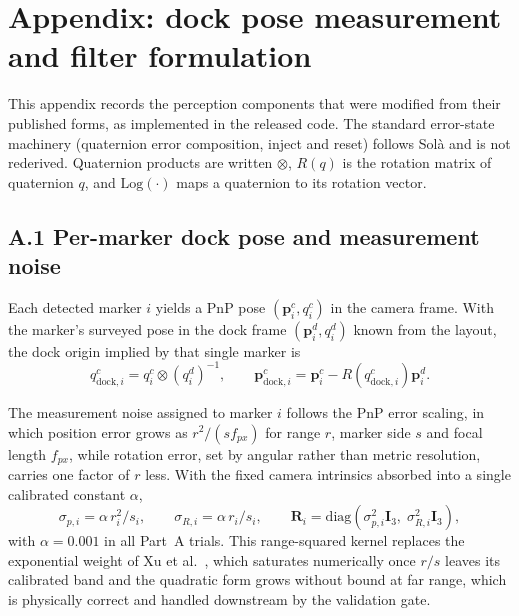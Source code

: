 \section*{Appendix: dock pose measurement and filter formulation}
\label{sec:appendix}

This appendix records the perception components that were modified from their published forms, as implemented in the released code. The standard error-state machinery (quaternion error composition, inject and reset) follows Sol\`a \cite{sola2017quaternion} and is not rederived. Quaternion products are written $\otimes$, $R(q)$ is the rotation matrix of quaternion $q$, and $\mathrm{Log}(\cdot)$ maps a quaternion to its rotation vector.

\subsection*{A.1 Per-marker dock pose and measurement noise}

Each detected marker $i$ yields a PnP pose $(\mathbf{p}_i^{c}, q_i^{c})$ in the camera frame. With the marker's surveyed pose in the dock frame $(\mathbf{p}_i^{d}, q_i^{d})$ known from the layout, the dock origin implied by that single marker is
\begin{equation}
    q_{\mathrm{dock},i}^{c} = q_i^{c} \otimes (q_i^{d})^{-1}, \qquad
    \mathbf{p}_{\mathrm{dock},i}^{c} = \mathbf{p}_i^{c} - R\!\left(q_{\mathrm{dock},i}^{c}\right)\mathbf{p}_i^{d}.
\end{equation}

The measurement noise assigned to marker $i$ follows the PnP error scaling, in which position error grows as $r^2/(s f_{px})$ for range $r$, marker side $s$ and focal length $f_{px}$, while rotation error, set by angular rather than metric resolution, carries one factor of $r$ less. With the fixed camera intrinsics absorbed into a single calibrated constant $\alpha$,
\begin{equation}
    \sigma_{p,i} = \alpha\, r_i^2 / s_i, \qquad
    \sigma_{R,i} = \alpha\, r_i / s_i, \qquad
    \mathbf{R}_i = \mathrm{diag}\!\left(\sigma_{p,i}^2 \mathbf{I}_3,\; \sigma_{R,i}^2 \mathbf{I}_3\right),
\end{equation}
with $\alpha = 0.001$ in all Part~A trials. This range-squared kernel replaces the exponential weight of Xu et al.\ \cite{xu2021underwater}, which saturates numerically once $r/s$ leaves its calibrated band and the quadratic form grows without bound at far range, which is physically correct and handled downstream by the validation gate.

